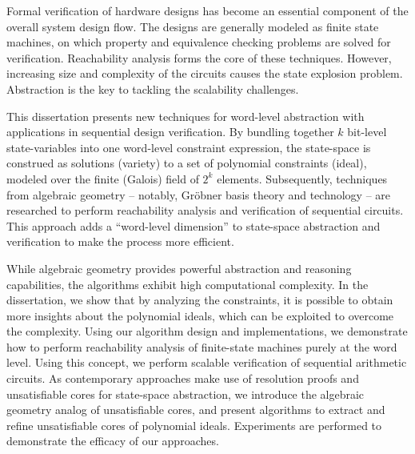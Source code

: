 Formal verification of hardware designs has become an essential
component of the overall system design flow. The designs are generally
modeled as finite state machines, on which property and equivalence
checking problems are solved for verification. Reachability analysis
forms the core of these techniques. However, increasing
size and complexity of the circuits causes the state explosion
problem. Abstraction is the key to tackling the scalability challenges.

This dissertation presents new techniques for word-level abstraction
with applications in sequential design verification. By bundling
together $k$ bit-level state-variables into one word-level constraint 
expression, the state-space is construed as solutions (variety) to
a set of polynomial constraints (ideal), modeled over the finite
(Galois) field of $2^k$ elements. Subsequently, techniques from
algebraic geometry -- notably, Gr\"obner basis theory and technology
-- are researched to perform reachability analysis and
verification of sequential circuits. This approach adds a ``word-level
dimension'' to state-space abstraction and verification to make the
process more efficient.

While algebraic geometry provides powerful abstraction and reasoning
capabilities, the algorithms exhibit high computational complexity. In
the dissertation, we show that by analyzing the constraints, it is
possible to obtain more insights about the polynomial ideals, which can be
exploited to overcome the complexity. Using our algorithm design and
implementations, we demonstrate how to perform reachability
analysis of finite-state machines purely at the word level. Using this
concept, we perform scalable verification of sequential arithmetic
circuits. As contemporary approaches make use of resolution proofs and
unsatisfiable cores for state-space abstraction, we introduce the
algebraic geometry analog of unsatisfiable cores, and present
algorithms to extract and refine unsatisfiable cores of polynomial
ideals. Experiments are performed to demonstrate the efficacy of our
approaches. 
